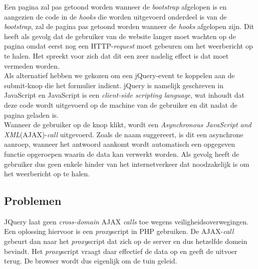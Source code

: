 Een pagina zal pas getoond worden wanneer de \textit{bootstrap} afgelopen is en aangezien de code in de \textit{hooks} die worden uitgevoerd onderdeel is van de \textit{bootstrap}, zal de pagina pas getoond worden wanneer de \textit{hooks} afgelopen zijn. Dit heeft als gevolg dat de gebruiker van de website langer moet wachten op de pagina omdat eerst nog een HTTP-\textit{request} moet gebeuren om het weerbericht op te halen. Het spreekt voor zich dat dit een zeer nadelig effect is dat moet vermeden worden.\\
Als alternatief hebben we gekozen om een jQuery-event te koppelen aan de submit-knop die het formulier indient. jQuery is namelijk geschreven in JavaScript en JavaScript is een \textit{client-side scripting language}, wat inhoudt dat deze code wordt uitgevoerd op de machine van de gebruiker en dit nadat de pagina geladen is.\\
Wanneer de gebruiker op de knop klikt, wordt een \textit{Asynchronous JavaScript and XML}(AJAX)-\textit{call} uitgevoerd.
Zoals de naam suggereert, is dit een asynchrone aanroep, wanneer het antwoord aankomt wordt automatisch een opgegeven functie opgeroepen waarin de data kan verwerkt worden. Als gevolg heeft de gebruiker dus geen enkele hinder van het internetverkeer dat noodzakelijk is om het weerbericht op te halen.


\subsection{Problemen}

JQuery laat geen \textit{cross-domain} AJAX \textit{calls} toe wegens veiligheidsoverwegingen. Een oplossing hiervoor is een \textit{proxy}script in PHP gebruiken.
De AJAX-\textit{call} gebeurt dan naar het \textit{proxy}script dat zich op de server en dus hetzelfde domein bevindt. Het \textit{proxy}script vraagt daar effectief de data op en geeft de uitvoer terug.
De browser wordt dus eigenlijk om de tuin geleid. \cite{crossDomainProblem}
